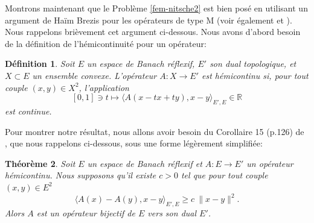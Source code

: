 \documentclass[11pt]{book}
\newenvironment{comments}{%
\begin{center}
 \color{blue}{
 {\bf Commentaire :}}

 \begin{tabular}{|p{0.8\textwidth}|}
 \hline
}{%
 \\ \hline \end{tabular}
 \end{center}
}
\newtheorem{theorem}{Théorème}[section]
\newtheorem{definition}[theorem]{Définition}
\newcommand{\be}{\begin{equation}}
\newcommand{\ee}{\end{equation}}
\newcommand{\beq}{\begin{eqnarray}}
\newcommand{\eeq}{\end{eqnarray}}
\newcommand{\pf}{\textbf{Preuve : }}
\newcommand{\cqfd}{{$\mbox{}$\hfill$\square$}}
\def\vv{{\bf v}}
\def\V{{\bf V}}
\newcommand{\ds}{\displaystyle}
\newcommand{\R}{\mathbb{R}}
\newcommand{\Gc}{\Gamma_{C}}
\newcommand{\igc}{{\ds\int_{\Gc}\hspace*{-0.7em}}}
\newcommand{\sn}{{\sigma_n}}
\begin{document}
  

Montrons maintenant que le Problème \eqref{fem-nitsche2} est bien posé en utilisant un argument de Ha\"im Brezis pour les opérateurs de type M %
\cite{brezis-68} (voir également \cite{lions-69} et \cite{kikuchi-song-81}). Nous rappelons brièvement cet argument ci-dessous.
Nous avons d'abord besoin de la définition de l'hémicontinuité pour un opérateur:
\begin{definition}
Soit $E$ un espace de Banach réflexif, $E'$ son dual topologique, et $X\subset E$ un ensemble convexe.
L'opérateur $A: X \rightarrow E'$ est hémicontinu si, pour tout couple $(x,y) \in X^2$, l'application
\[ %
[0,1]\ni t \mapsto \langle A(x-tx+ty), x-y \rangle_{E',E} \in \R
\] %
est continue.
\end{definition}
Pour montrer notre résultat, nous allons avoir besoin du Corollaire 15 (p.126) de \cite{brezis-68}, que nous rappelons ci-dessous, sous une forme légèrement simplifiée:
\begin{theorem}
\label{thm:exuniqBrezis}
Soit $E$ un espace de Banach réflexif et $A:E\rightarrow E'$ un opérateur hémicontinu.
Nous supposons qu'il existe $c>0$ tel que pour tout couple $(x,y) \in E^2$ 
\[ %
\langle A(x) - A(y) , x-y \rangle_{E',E} \geq c \: \| x - y \|^2.
\] %
Alors $A$ est un opérateur bijectif de $E$ vers son dual $E'$.
\end{theorem}
\end{document}
